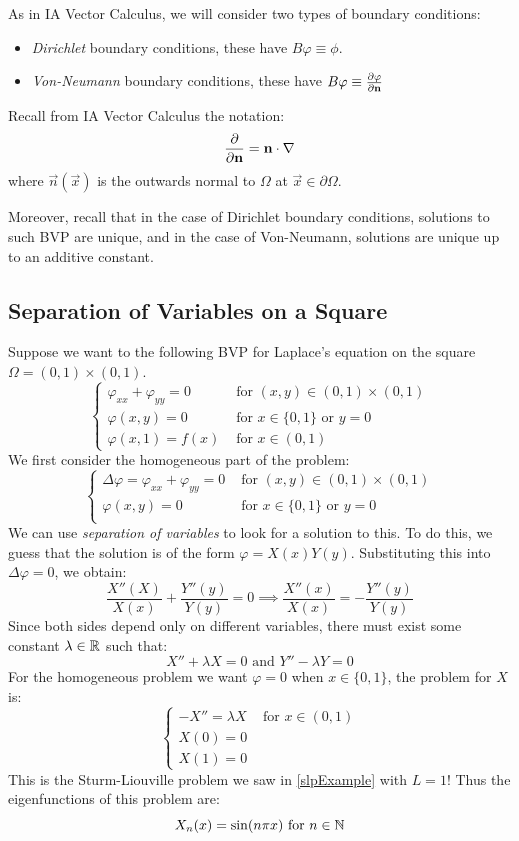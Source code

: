 \documentclass[../main.tex]{subfiles}
\begin{document}
As in IA Vector Calculus, we will consider two types of boundary conditions:
\begin{itemize}
  \item \textit{Dirichlet} boundary conditions, these have $B \varphi \equiv \phi$.
  \item \textit{Von-Neumann} boundary conditions, these have $B \varphi \equiv \pderiv{\varphi}{\vec{n}}$
\end{itemize}
\begin{remark}[Recap]
  Recall from IA Vector Calculus the notation:
  \[
    \pderiv{}{\vec{n}} = \vec{n} \cdot \nabla
  \]
  where $\vec{n}(\vec{x})$ is the outwards normal to $\Omega$ at $\vec{x} \in \partial \Omega$.

  Moreover, recall that in the case of Dirichlet boundary conditions, solutions to such BVP are unique, and in the case of Von-Neumann, solutions are unique up to an additive constant.
\end{remark}
\subsection{Separation of Variables on a Square} \label{sepSquare}
Suppose we want to the following BVP for Laplace's equation on the square $\Omega = (0, 1) \times (0, 1)$.
\[
  \begin{cases}
  \varphi_{x x} + \varphi_{y y} = 0 & \text{ for } (x, y) \in (0, 1) \times (0, 1) \\
  \varphi(x, y) = 0 & \text{ for } x \in \{0, 1\} \text{ or } y = 0 \\
  \varphi(x, 1) = f(x) &  \text{ for } x \in (0, 1)
  \end{cases}
\]
We first consider the homogeneous part of the problem:
\[
  \begin{cases}
  \Delta \varphi = \varphi_{x x} + \varphi_{y y} = 0 & \text{ for } (x, y) \in (0, 1) \times (0, 1) \\
  \varphi(x, y) = 0 & \text{ for } x \in \{0, 1\} \text{ or } y = 0 \\
  \end{cases}
\]
We can use \textit{separation of variables} to look for a solution to this.
To do this, we guess that the solution is of the form $\varphi = X(x)Y(y)$.
Substituting this into $\Delta \varphi = 0$, we obtain:
\[
  \frac{X''(X)}{X(x)} + \frac{Y''(y)}{Y(y)} = 0 \implies \frac{X''(x)}{X(x)} = - \frac{Y''(y)}{Y(y)}
\]
Since both sides depend only on different variables, there must exist some constant $\lambda \in \mathbb{R}$ such that:
\[
  X'' + \lambda X = 0 \text{ and } Y'' - \lambda Y = 0
\]
For the homogeneous problem we want $\varphi = 0$ when $x \in \{0, 1\}$, the problem for $X$ is:
\[
  \begin{cases}
  -X'' = \lambda X & \text{ for } x \in (0, 1) \\
  X(0) = 0 &  \\
  X(1) = 0 &
  \end{cases}
\]
This is the Sturm-Liouville problem we saw in \cref{slpExample} with $L = 1$!
Thus the eigenfunctions of this problem are:
\[
  X_n(x) = \sin(n \pi x) \text{ for } n \in \mathbb{N}
\]
\end{document}
